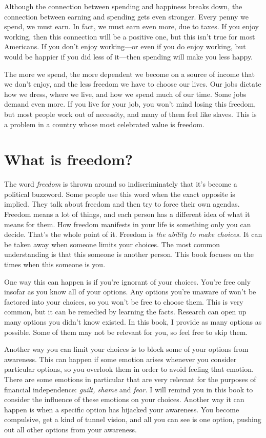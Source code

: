 Although the connection between spending and happiness breaks down, the connection between earning and spending gets even stronger. Every penny we spend, we must earn. In fact, we must earn even more, due to taxes. If you enjoy working, then this connection will be a positive one, but this isn't true for most Americans. If you don't enjoy working---or even if you do enjoy working, but would be happier if you did less of it---then spending will make you less happy.

The more we spend, the more dependent we become on a source of income that we don't enjoy, and the less freedom we have to choose our lives. Our jobs dictate how we dress, where we live, and how we spend much of our time. Some jobs demand even more. If you live for your job, you won't mind losing this freedom, but most people work out of necessity, and many of them feel like slaves. This is a problem in a country whose most celebrated value is freedom.

\section{What is freedom?}
The word \emph{freedom} is thrown around so indiscriminately that it's become a political buzzword. Some people use this word when the exact opposite is implied. They talk about freedom and then try to force their own agendas. Freedom means a lot of things, and each person has a different idea of what it means for them. How freedom manifests in your life is something only you can decide. That's the whole point of it. Freedom is \emph{the ability to make choices.} It can be taken away when someone limits your choices. The most common understanding is that this someone is another person. This book focuses on the times when this someone is you.

One way this can happen is if you're ignorant of your choices. You're free only insofar as you know all of your options. Any options you're unaware of won't be factored into your choices, so you won't be free to choose them. This is very common, but it can be remedied by learning the facts. Research can open up many options you didn't know existed. In this book, I provide as many options as possible. Some of them may not be relevant for you, so feel free to skip them.

Another way you can limit your choices is to block some of your options from awareness. This can happen if some emotion arises whenever you consider particular options, so you overlook them in order to avoid feeling that emotion. There are some emotions in particular that are very relevant for the purposes of financial independence: \emph{guilt, shame} and \emph{fear.} I will remind you in this book to consider the influence of these emotions on your choices. Another way it can happen is when a specific option has hijacked your awareness. You become compulsive, get a kind of tunnel vision, and all you can see is one option, pushing out all other options from your awareness.

